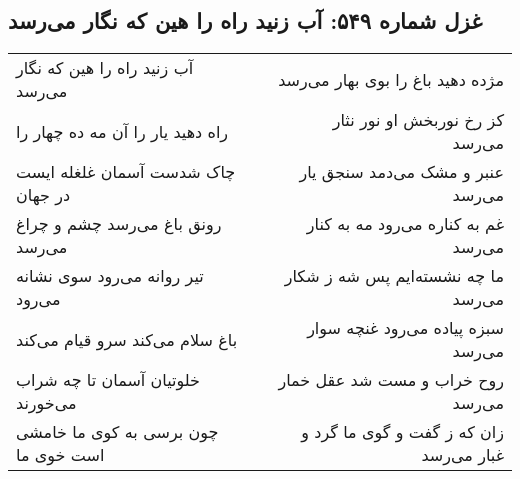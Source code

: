 \begin{center}
\section*{غزل شماره ۵۴۹: آب زنید راه را هین که نگار می‌رسد}
\label{sec:0549}
\begin{longtable}{l p{0.5cm} r}
آب زنید راه را هین که نگار می‌رسد
&&
مژده دهید باغ را بوی بهار می‌رسد
\\
راه دهید یار را آن مه ده چهار را
&&
کز رخ نوربخش او نور نثار می‌رسد
\\
چاک شدست آسمان غلغله ایست در جهان
&&
عنبر و مشک می‌دمد سنجق یار می‌رسد
\\
رونق باغ می‌رسد چشم و چراغ می‌رسد
&&
غم به کناره می‌رود مه به کنار می‌رسد
\\
تیر روانه می‌رود سوی نشانه می‌رود
&&
ما چه نشسته‌ایم پس شه ز شکار می‌رسد
\\
باغ سلام می‌کند سرو قیام می‌کند
&&
سبزه پیاده می‌رود غنچه سوار می‌رسد
\\
خلوتیان آسمان تا چه شراب می‌خورند
&&
روح خراب و مست شد عقل خمار می‌رسد
\\
چون برسی به کوی ما خامشی است خوی ما
&&
زان که ز گفت و گوی ما گرد و غبار می‌رسد
\\
\end{longtable}
\end{center}
